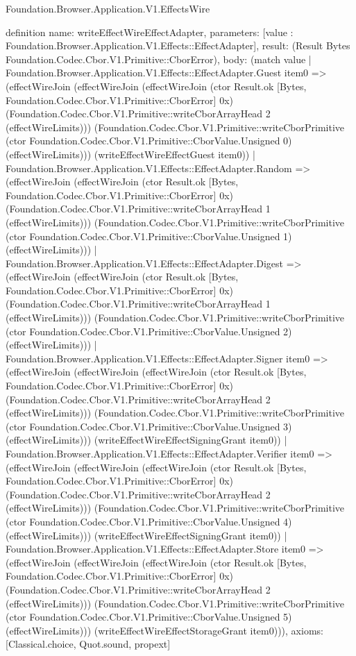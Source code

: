 \begin{lexlean}{Foundation.Browser.Application.V1.EffectsWire}
\begin{semanticmodule}
definition{
  name: writeEffectWireEffectAdapter,
  parameters: [value : Foundation.Browser.Application.V1.Effects::EffectAdapter],
  result: (Result Bytes Foundation.Codec.Cbor.V1.Primitive::CborError),
  body: (match value
    | Foundation.Browser.Application.V1.Effects::EffectAdapter.Guest item0 => (effectWireJoin (effectWireJoin (effectWireJoin (ctor Result.ok [Bytes, Foundation.Codec.Cbor.V1.Primitive::CborError] 0x) (Foundation.Codec.Cbor.V1.Primitive::writeCborArrayHead 2 (effectWireLimits))) (Foundation.Codec.Cbor.V1.Primitive::writeCborPrimitive (ctor Foundation.Codec.Cbor.V1.Primitive::CborValue.Unsigned 0) (effectWireLimits))) (writeEffectWireEffectGuest item0))
    | Foundation.Browser.Application.V1.Effects::EffectAdapter.Random => (effectWireJoin (effectWireJoin (ctor Result.ok [Bytes, Foundation.Codec.Cbor.V1.Primitive::CborError] 0x) (Foundation.Codec.Cbor.V1.Primitive::writeCborArrayHead 1 (effectWireLimits))) (Foundation.Codec.Cbor.V1.Primitive::writeCborPrimitive (ctor Foundation.Codec.Cbor.V1.Primitive::CborValue.Unsigned 1) (effectWireLimits)))
    | Foundation.Browser.Application.V1.Effects::EffectAdapter.Digest => (effectWireJoin (effectWireJoin (ctor Result.ok [Bytes, Foundation.Codec.Cbor.V1.Primitive::CborError] 0x) (Foundation.Codec.Cbor.V1.Primitive::writeCborArrayHead 1 (effectWireLimits))) (Foundation.Codec.Cbor.V1.Primitive::writeCborPrimitive (ctor Foundation.Codec.Cbor.V1.Primitive::CborValue.Unsigned 2) (effectWireLimits)))
    | Foundation.Browser.Application.V1.Effects::EffectAdapter.Signer item0 => (effectWireJoin (effectWireJoin (effectWireJoin (ctor Result.ok [Bytes, Foundation.Codec.Cbor.V1.Primitive::CborError] 0x) (Foundation.Codec.Cbor.V1.Primitive::writeCborArrayHead 2 (effectWireLimits))) (Foundation.Codec.Cbor.V1.Primitive::writeCborPrimitive (ctor Foundation.Codec.Cbor.V1.Primitive::CborValue.Unsigned 3) (effectWireLimits))) (writeEffectWireEffectSigningGrant item0))
    | Foundation.Browser.Application.V1.Effects::EffectAdapter.Verifier item0 => (effectWireJoin (effectWireJoin (effectWireJoin (ctor Result.ok [Bytes, Foundation.Codec.Cbor.V1.Primitive::CborError] 0x) (Foundation.Codec.Cbor.V1.Primitive::writeCborArrayHead 2 (effectWireLimits))) (Foundation.Codec.Cbor.V1.Primitive::writeCborPrimitive (ctor Foundation.Codec.Cbor.V1.Primitive::CborValue.Unsigned 4) (effectWireLimits))) (writeEffectWireEffectSigningGrant item0))
    | Foundation.Browser.Application.V1.Effects::EffectAdapter.Store item0 => (effectWireJoin (effectWireJoin (effectWireJoin (ctor Result.ok [Bytes, Foundation.Codec.Cbor.V1.Primitive::CborError] 0x) (Foundation.Codec.Cbor.V1.Primitive::writeCborArrayHead 2 (effectWireLimits))) (Foundation.Codec.Cbor.V1.Primitive::writeCborPrimitive (ctor Foundation.Codec.Cbor.V1.Primitive::CborValue.Unsigned 5) (effectWireLimits))) (writeEffectWireEffectStorageGrant item0))),
  axioms: [Classical.choice, Quot.sound, propext]
}


\end{semanticmodule}
\end{lexlean}
